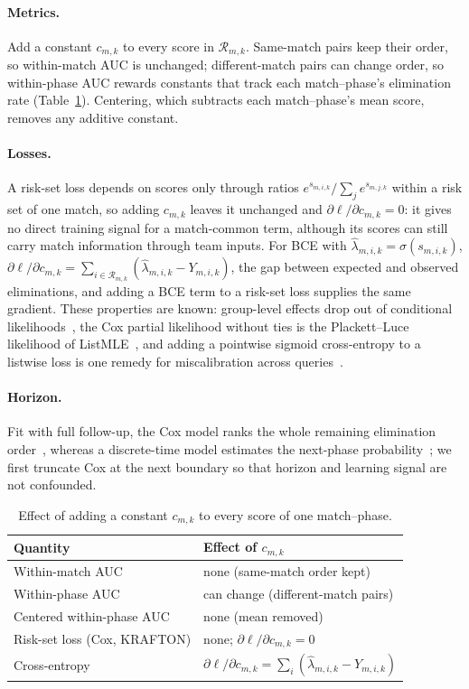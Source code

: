 \documentclass[sigconf,anonymous]{acmart}
\begin{document}
\paragraph{Metrics.}
Add a constant $c_{m,k}$ to every score in $\mathcal{R}_{m,k}$. Same-match pairs keep their order, so within-match AUC is unchanged; different-match pairs can change order, so within-phase AUC rewards constants that track each match--phase's elimination rate (Table~\ref{tab:account}). Centering, which subtracts each match--phase's mean score, removes any additive constant.

\paragraph{Losses.}
A risk-set loss depends on scores only through ratios $e^{s_{m,i,k}}/\sum_{j}e^{s_{m,j,k}}$ within a risk set of one match, so adding $c_{m,k}$ leaves it unchanged and $\partial\ell/\partial c_{m,k}=0$: it gives no direct training signal for a match-common term, although its scores can still carry match information through team inputs. For BCE with $\hat\lambda_{m,i,k}=\sigma(s_{m,i,k})$, $\partial\ell/\partial c_{m,k}=\sum_{i\in\mathcal{R}_{m,k}}(\hat\lambda_{m,i,k}-Y_{m,i,k})$, the gap between expected and observed eliminations, and adding a BCE term to a risk-set loss supplies the same gradient. These properties are known: group-level effects drop out of conditional likelihoods~\cite{Chamberlain80}, the Cox partial likelihood without ties is the Plackett--Luce likelihood of ListMLE~\cite{Xia08}, and adding a pointwise sigmoid cross-entropy to a listwise loss is one remedy for miscalibration across queries~\cite{Bai23}.

\paragraph{Horizon.}
Fit with full follow-up, the Cox model ranks the whole remaining elimination order~\cite{Cox72}, whereas a discrete-time model estimates the next-phase probability~\cite{SingerWillett93,Gensheimer19}; we first truncate Cox at the next boundary so that horizon and learning signal are not confounded.

\begin{table}[t]
\centering\footnotesize
\caption{Effect of adding a constant $c_{m,k}$ to every score of one match--phase.}
\label{tab:account}
\setlength{\tabcolsep}{3pt}
\begin{tabular}{ll}
\toprule
Quantity & Effect of $c_{m,k}$ \\
\midrule
Within-match AUC & none (same-match order kept) \\
Within-phase AUC & can change (different-match pairs) \\
Centered within-phase AUC & none (mean removed) \\
Risk-set loss (Cox, KRAFTON) & none; $\partial\ell/\partial c_{m,k}=0$ \\
Cross-entropy & $\partial\ell/\partial c_{m,k}=\sum_{i}(\hat\lambda_{m,i,k}-Y_{m,i,k})$ \\
\bottomrule
\end{tabular}
\end{table}
\end{document}
